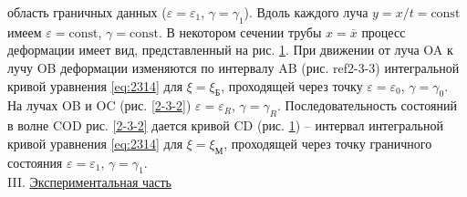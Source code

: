 \documentclass[specialist, subf, href, colorlinks=true, 14pt, final]{disser}
\theoremstyle{definition}
\newcommand{\const}{\text{const}}
\newcommand{\npart}[2]{\noindent #1. \underline{#2}}
\begin{document}
\begin{figure}[h]
\begin{center}
\begin{minipage}[h]{0.45\linewidth}
\caption{}
\label{2-3-3}
\end{minipage}
\end{center}
\end{figure}
область граничных данных ($\varepsilon = \varepsilon_{1}$, $\gamma = \gamma_1$). Вдоль каждого луча $y = x/t = \const$ имеем $\varepsilon = \const$, $\gamma = \const$. В некотором сечении трубы $x = \overline{x}$ процесс деформации имеет вид, представленный на рис. \ref{2-3-3}. При движении от луча OA к лучу OB деформации изменяются по интервалу AB (рис. ref{2-3-3}) интегральной кривой уравнения \eqref{eq:2314} для $\xi = \xi_{\text{Б}}$, проходящей через точку $\varepsilon = \varepsilon_0$, $\gamma = \gamma_0$. На лучах OB и OC (рис. \ref{2-3-2}) $\varepsilon = \varepsilon_R$, $\gamma = \gamma_R$. Последовательность состояний в волне COD рис. \ref{2-3-2} дается кривой CD (рис. \ref{2-3-3}) -- интервал интегральной кривой уравнения \eqref{eq:2314} для $\xi = \xi_{\text{М}}$, проходящей через точку граничного состояния $\varepsilon = \varepsilon_1$, $\gamma = \gamma_1$.\\

\npart{III}{Экспериментальная часть}
\end{document}
